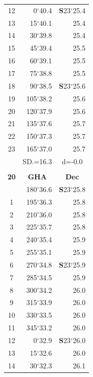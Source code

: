 \documentclass[10pt, a4paper]{report}
\begin{document}
\begin{scriptsize}
\begin{tabular*}{0.2\textwidth}[t]{@{\extracolsep{\fill}}|c|rr|}
12 & 0$^\circ$40.4 & \textbf{S}23$^\circ$25.4\\
13 & 15$^\circ$40.1 & 25.4\\
14 & 30$^\circ$39.8 & 25.4\\
15 & 45$^\circ$39.4 & \raisebox{0.24ex}{\boldmath$\cdot$~\boldmath$\cdot$~~}25.5\\
16 & 60$^\circ$39.1 & 25.5\\
17 & 75$^\circ$38.8 & 25.5\\[2Pt]
18 & 90$^\circ$38.5 & \textbf{S}23$^\circ$25.6\\
19 & 105$^\circ$38.2 & 25.6\\
20 & 120$^\circ$37.9 & 25.6\\
21 & 135$^\circ$37.6 & \raisebox{0.24ex}{\boldmath$\cdot$~\boldmath$\cdot$~~}25.7\\
22 & 150$^\circ$37.3 & 25.7\\
23 & 165$^\circ$37.0 & 25.7\\
\hline
\rule{0pt}{2.4ex} & \multicolumn{1}{c}{SD.=16.3} & \multicolumn{1}{c|}{d=-0.0}\\
\hline
\multicolumn{1}{c}{}\\[-0.5ex]\hline
\multicolumn{1}{|c|}{\rule{0pt}{2.6ex}\textbf{20}} & \multicolumn{1}{c}{\textbf{GHA}} & \multicolumn{1}{c|}{\textbf{Dec}}\\
\hline\rule{0pt}{2.6ex}\noindent
0 & 180$^\circ$36.6 & \textbf{S}23$^\circ$25.8\\
1 & 195$^\circ$36.3 & 25.8\\
2 & 210$^\circ$36.0 & 25.8\\
3 & 225$^\circ$35.7 & \raisebox{0.24ex}{\boldmath$\cdot$~\boldmath$\cdot$~~}25.8\\
4 & 240$^\circ$35.4 & 25.9\\
5 & 255$^\circ$35.1 & 25.9\\[2Pt]
6 & 270$^\circ$34.8 & \textbf{S}23$^\circ$25.9\\
7 & 285$^\circ$34.5 & 25.9\\
8 & 300$^\circ$34.2 & 26.0\\
9 & 315$^\circ$33.9 & \raisebox{0.24ex}{\boldmath$\cdot$~\boldmath$\cdot$~~}26.0\\
10 & 330$^\circ$33.5 & 26.0\\
11 & 345$^\circ$33.2 & 26.0\\[2Pt]
12 & 0$^\circ$32.9 & \textbf{S}23$^\circ$26.0\\
13 & 15$^\circ$32.6 & 26.0\\
14 & 30$^\circ$32.3 & 26.1\\

\end{tabular*}
\end{scriptsize}
\end{document}
